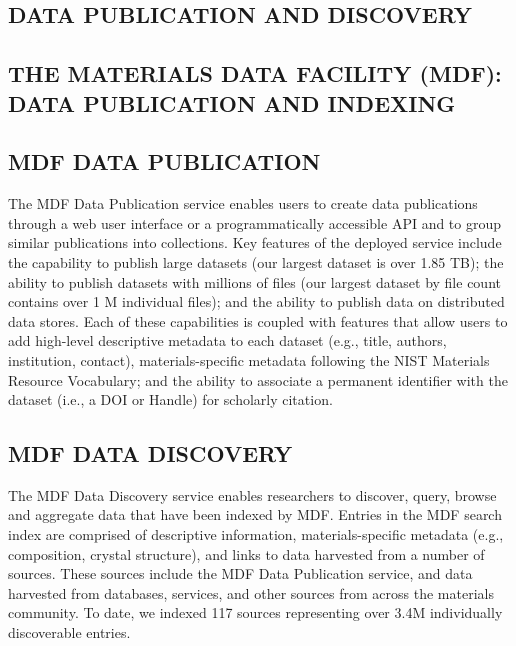 \documentclass{aip-cp}
\newcommand\ben[1]{}
\newcommand\ryan[1]{}
\newcommand\ben[1]{{\color{blue}[Ben: #1]}}
\newcommand\ryan[1]{{\color{green}[Ryan: #1]}}
\begin{document}
\subsection{DATA PUBLICATION AND DISCOVERY}
\ryan{Make this more general with MDF and search being the main selling points?}

\ryan{from talk:
- Move to permanent location (or publish in place)
- Compute and record checksums
- Obtain and record metadata 
- Assign persistent identifier 
- Index for discovery}



\subsection{THE MATERIALS DATA FACILITY (MDF): DATA PUBLICATION AND INDEXING}

\ben{Add MDF overview text and text linking this to the other sections}

\subsection{MDF DATA PUBLICATION} 
The MDF Data Publication service enables
users to create data publications through a web user interface or a
programmatically accessible API and to group similar publications into
collections. Key features of the deployed service include the capability to
publish large datasets (our largest dataset is over 1.85 TB); the ability to
publish datasets with millions of files (our largest dataset by file count
contains over 1 M individual files); and the ability to publish data on
distributed data stores. Each of these capabilities is coupled with
features that allow users to add high-level descriptive metadata to each dataset
(e.g., title, authors, institution, contact), materials-specific metadata
following the NIST Materials Resource Vocabulary; and the ability to associate
a permanent identifier with the dataset (i.e., a DOI or Handle) for scholarly
citation.

\subsection{MDF DATA DISCOVERY} 
The MDF Data Discovery service enables
researchers to discover, query, browse and aggregate data that have been
indexed by MDF. Entries in the MDF search index are comprised of descriptive
information, materials-specific metadata (e.g., composition, crystal
structure), and links to data harvested from a number of sources. These
sources include the MDF Data Publication service, and
data harvested from databases, services, and other sources from across the
materials community. To date, we indexed 117 sources representing over 3.4M
individually discoverable entries.
\end{document}
